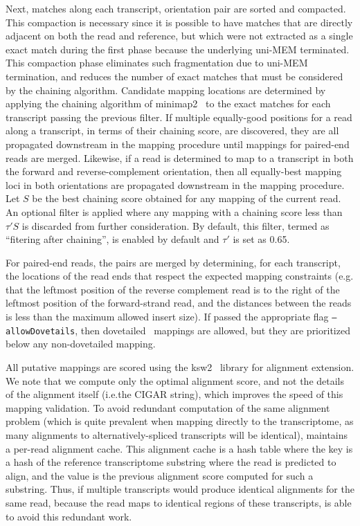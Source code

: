 Next, matches along each transcript, orientation pair are sorted and
compacted. This compaction is necessary since it is possible to have matches
that are directly adjacent on both the read and reference, but which were not
extracted as a single exact match during the first phase because the
underlying uni-MEM terminated. This compaction phase eliminates such
fragmentation due to uni-MEM termination, and reduces the number of exact
matches that must be considered by the chaining algorithm. Candidate mapping
locations are determined by applying the chaining algorithm of
minimap2~\citep{minimap2} to the exact matches for each transcript passing the
previous filter. If multiple equally-good positions for a read along a
transcript, in terms of their chaining score, are discovered, they are all
propagated downstream in the mapping procedure until mappings for paired-end
reads are merged. Likewise, if a read is determined to map to a transcript in
both the forward and reverse-complement orientation, then all equally-best
mapping loci in both orientations are propagated downstream in the mapping
procedure.  Let $S$ be the best chaining score obtained for any mapping of
the current read.  An optional filter is applied where any mapping with a 
chaining score less than $\tau' S$ is discarded from further consideration.
By default, this filter, termed as ``fitering after chaining'', is enabled 
by default and $\tau'$ is set as 0.65.

For paired-end reads, the pairs are merged by determining, for each
transcript, the locations of the read ends that respect the expected mapping
constraints (e.g. that the leftmost position of the reverse complement read
is to the right of the leftmost position of the forward-strand read, and the
distances between the reads is less than the maximum allowed insert size). If
passed the appropriate flag \texttt{--allowDovetails}, then
dovetailed~\citep{bt2manual} mappings are allowed, but they are prioritized
below any non-dovetailed mapping.


All putative mappings are scored using the ksw2~\citep{minimap2,suzuki2018introducing} library
for alignment extension. We note that we compute only the optimal alignment
score, and not the details of the alignment itself (i.e.\@ the CIGAR string),
which improves the speed of this mapping validation. To avoid redundant
computation of the same alignment problem (which is quite prevalent when mapping
directly to the transcriptome, as many alignments to alternatively-spliced
transcripts will be identical), \hsa maintains a per-read alignment cache. This
alignment cache is a hash table where the key is a hash of the reference
transcriptome substring where the read is predicted to align, and the value is
the previous alignment score computed for such a substring. Thus, if multiple
transcripts would produce identical alignments for the same read, because the
read maps to identical regions of these transcripts, \hsa is able to avoid
this redundant work.

